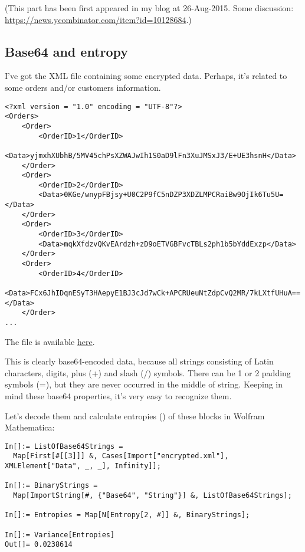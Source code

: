 \label{encrypted_DB1}

(This part has been first appeared in my blog at 26-Aug-2015.
Some discussion: \url{https://news.ycombinator.com/item?id=10128684}.)

\subsection{Base64 and entropy}

I've got the \ac{XML} file containing some encrypted data.
Perhaps, it's related to some orders and/or customers information.

\begin{lstlisting}
<?xml version = "1.0" encoding = "UTF-8"?>
<Orders>
	<Order>
		<OrderID>1</OrderID>
		<Data>yjmxhXUbhB/5MV45chPsXZWAJwIh1S0aD9lFn3XuJMSxJ3/E+UE3hsnH</Data>
	</Order>
	<Order>
		<OrderID>2</OrderID>
		<Data>0KGe/wnypFBjsy+U0C2P9fC5nDZP3XDZLMPCRaiBw9OjIk6Tu5U=</Data>
	</Order>
	<Order>
		<OrderID>3</OrderID>
		<Data>mqkXfdzvQKvEArdzh+zD9oETVGBFvcTBLs2ph1b5bYddExzp</Data>
	</Order>
	<Order>
		<OrderID>4</OrderID>
		<Data>FCx6JhIDqnESyT3HAepyE1BJ3cJd7wCk+APCRUeuNtZdpCvQ2MR/7kLXtfUHuA==</Data>
	</Order>
...
\end{lstlisting}

The file is available \href{https://raw.githubusercontent.com/DennisYurichev/RE-for-beginners/master/examples/encrypted_DB1/encrypted.xml}{here}.

This is clearly base64-encoded data, because all strings consisting of Latin characters, digits,
plus (+) and slash (/) symbols.
There can be 1 or 2 padding symbols (=), but they are never occurred in the middle of string.
Keeping in mind these base64 properties, it's very easy to recognize them.

Let's decode them and calculate entropies () of these blocks in Wolfram Mathematica:

\begin{lstlisting}
In[]:= ListOfBase64Strings =
  Map[First[#[[3]]] &, Cases[Import["encrypted.xml"], XMLElement["Data", _, _], Infinity]];

In[]:= BinaryStrings =
  Map[ImportString[#, {"Base64", "String"}] &, ListOfBase64Strings];

In[]:= Entropies = Map[N[Entropy[2, #]] &, BinaryStrings];

In[]:= Variance[Entropies]
Out[]= 0.0238614
\end{lstlisting}

